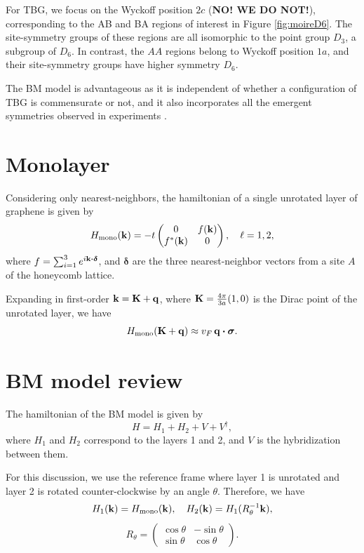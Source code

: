 For TBG, we focus on the Wyckoff position $2c$ (\textbf{NO! WE DO NOT!}), corresponding to the AB and BA regions of interest in Figure \ref{fig:moireD6}. The site-symmetry groups of these regions are all isomorphic to the point group $D_3$, a subgroup of $D_6$. In contrast, the $AA$ regions belong to Wyckoff position $1a$, and their site-symmetry groups have higher symmetry $D_6$.

The BM model is advantageous as it is independent of whether a configuration of TBG is commensurate or not, and it also incorporates all the emergent symmetries observed in experiments \cite{zou2018}.

\section{Monolayer}

Considering only nearest-neighbors, the hamiltonian of a single unrotated layer of graphene is given by
$$
H_{\text{mono}}({\vb{k}}) = -t
\begin{pmatrix}
0 & f({\vb{k}}) \\
f^*({\vb{k}}) & 0
\end{pmatrix}
, \quad \ell = 1, 2,
$$
where $f = \sum_{i=1}^{3} e^{i \k \vdot \bm{\delta}}$, and $\bm{\delta}$ are the three nearest-neighbor vectors from a site $A$ of the honeycomb lattice.

Expanding in first-order ${\vb{k}} = {\vb{K}} + {\vb{q}}$, where ${\vb{K}} = \frac{4\pi}{3a} (1, 0)$ is the Dirac point of the unrotated layer, we have
$$
H_{\text{mono}}(\K + \q) \approx v_F \, \q \vdot \bm{\sigma}.
$$

\section{BM model review}

The hamiltonian of the BM model is given by
$$
H = H_1 + H_2 + V + V^\dagger,
$$
where $H_1$ and $H_2$ correspond to the layers 1 and 2, and $V$ is the hybridization between them.

\n

For this discussion, we use the reference frame where layer 1 is unrotated and layer 2 is rotated counter-clockwise by an angle $\theta$. Therefore, we have
$$
H_1({\vb{k}}) = H_{\text{mono}}({\vb{k}}), \quad H_2({\vb{k}}) = H_1(R_\theta^{-1}{\vb{k}}),
$$
$$
R_\theta =
\begin{pmatrix}
\cos\theta & -\sin\theta \\
\sin\theta & \cos\theta
\end{pmatrix}.
$$

